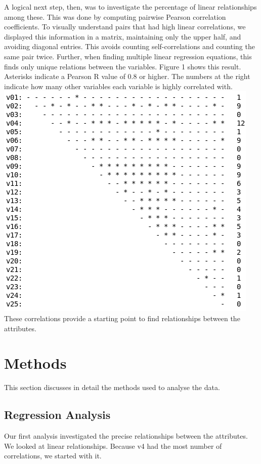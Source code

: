 \documentclass[12pt,a4paper,twocolumn]{article}
\begin{document}
	A logical next step, then, was to investigate the percentage of linear relationships among these. This was done by computing pairwise Pearson correlation coefficients. To visually understand pairs that had high linear correlations, we displayed this information in a matrix, maintaining only the upper half, and avoiding diagonal entries. This avoids counting self-correlations and counting the same pair twice. Further, when finding multiple linear regression equations, this finds only unique relations between the variables. Figure 1 shows this result. Asterisks indicate a Pearson R value of 0.8 or higher. The numbers at the right indicate how many other variables each variable is highly correlated with. \\
	
	\includegraphics[scale=0.4]{fig1.png}
	\begingroup
	\endgroup
	\hfill\break
	These correlations provide a starting point to find relationships between the attributes.
	
	\section{Methods}
	This section discusses in detail the methods used to analyse the data.
	
	\subsection{Regression Analysis}
	Our first analysis investigated the precise relationships between the attributes. We looked at linear relationships. Because v4 had the most number of correlations, we started with it.
	
\end{document}
